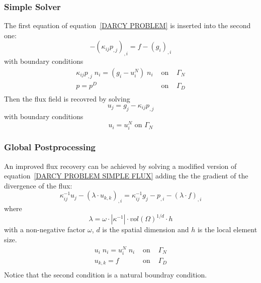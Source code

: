 \subsubsection{Simple Solver}\label{SEC DARCY SIMPLE}
The first equation of equation~\ref{DARCY PROBLEM} is inserted into the second one:
\begin{equation}\label{DARCY PROBLEM SIMPLE}
- (\kappa_{ij} p_{,j})_{,i}  =  f  - (g_{i})_{,i}
\end{equation} 
with boundary conditions
\begin{equation}\label{DARCY BOUNDARY SIMPLE}
\begin{array}{rcl}
\kappa_{ij} p_{,j} \; n_{i}  = ( g_{i} - u^{N}_{i} )  \; n_{i} & \mbox{ on } & \Gamma_{N} \\
p = p^{D} &  \mbox{ on } & \Gamma_{D} \\ 
\end{array}
\end{equation} 
Then the flux field is recovred by solving
\begin{equation}\label{DARCY PROBLEM SIMPLE FLUX}
 u_{j} = g_j -  \kappa_{ij} p_{,j}  
\end{equation} 
with boundary conditions
\begin{equation}\label{DARCY SIMPLE BOUNDARY FLUX}
u_{i} = u^{N}_{i}  \mbox{ on }  \Gamma_{N}
\end{equation} 

\subsubsection{Global Postprocessing \label{SEC DARCY POST}}
An improved flux recovery can be achieved by solving a modified version of equation~\ref{DARCY PROBLEM SIMPLE FLUX}
adding the the gradient of the divergence of the flux:
\begin{equation}\label{DARCY PROBLEM POST FLUX}
\kappa^{-1}_{ij} u_{j} - 
(\lambda \cdot u_{k,k} )_{,i}= 
\kappa^{-1}_{ij} g_j- p_{,i} 
- (\lambda \cdot f )_{,i} 
\end{equation} 
where
\begin{equation}\label{DARCY PROBLEM POST FLUX A}
\lambda = \omega \cdot |\kappa^{-1}| \cdot vol(\Omega)^{1/d} \cdot h 
\end{equation} 
with a non-negative factor $\omega$, $d$ is the spatial dimension and $h$ is the local element size.
\begin{equation}\label{DARCY PROBLEM POST FLUX BOUNDARY}
\begin{array}{rcl}
u_{i} \; n_{i}  = u^{N}_{i}  \; n_{i} & \mbox{ on } & \Gamma_{N} \\
u_{k,k} = f & \mbox{ on } & \Gamma_{D} \\ 
\end{array}
\end{equation}   
Notice that the second condition is a natural boundray condition.

